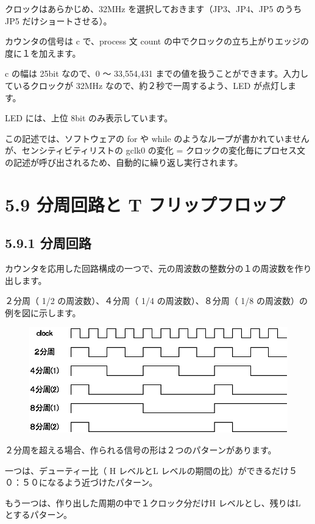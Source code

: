 \documentclass[letterpaper,10pt,dvipdfmx]{sphinxmanual}
\begin{document}
クロックはあらかじめ、32MHz を選択しておきます（JP3、JP4、JP5 のうち JP5 だけショートさせる）。

カウンタの信号は c で、process 文 count の中でクロックの立ち上がりエッジの度に１を加えます。

c の幅は 25bit なので、0 ～ 33,554,431 までの値を扱うことができます。入力しているクロックが 32MHz なので、約２秒で一周するよう、LED が点灯します。

LED には、上位 8bit のみ表示しています。

この記述では、ソフトウェアの for や while のようなループが書かれていませんが、センシティビティリストの gclk0 の変化 = クロックの変化毎にプロセス文の記述が呼び出されるため、自動的に繰り返し実行されます。


\section{5.9 分周回路と T フリップフロップ}
\label{05_try:t}

\subsection{5.9.1 分周回路}
\label{05_try:id15}
カウンタを応用した回路構成の一つで、元の周波数の整数分の１の周波数を作り出します。

２分周（ 1/2 の周波数）、４分周（ 1/4 の周波数）、８分周（ 1/8 の周波数）の例を図に示します。
\begin{figure}[htbp]
\centering

\includegraphics{figure16.eps}
\end{figure}

２分周を超える場合、作られる信号の形は２つのパターンがあります。

一つは、デューティー比（ H レベルとL レベルの期間の比）ができるだけ５０：５０になるよう近づけたパターン。

もう一つは、作り出した周期の中で１クロック分だけH レベルとし、残りはL とするパターン。
\end{document}
